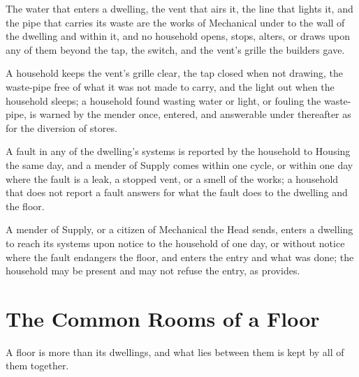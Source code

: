 \begin{clauses}
\item The water that enters a dwelling, the vent that airs it, the line that lights it, and the pipe that carries its waste are the works of Mechanical under  to the wall of the dwelling and within it, and no household opens, stops, alters, or draws upon any of them beyond the tap, the switch, and the vent's grille the builders gave.
\item A household keeps the vent's grille clear, the tap closed when not drawing, the waste-pipe free of what it was not made to carry, and the light out when the household sleeps; a household found wasting water or light, or fouling the waste-pipe, is warned by the mender once, entered, and answerable under  thereafter as for the diversion of stores.
\item A fault in any of the dwelling's systems is reported by the household to Housing the same day, and a mender of Supply comes within one cycle, or within one day where the fault is a leak, a stopped vent, or a smell of the works; a household that does not report a fault answers for what the fault does to the dwelling and the floor.
\item A mender of Supply, or a citizen of Mechanical the Head sends, enters a dwelling to reach its systems upon notice to the household of one day, or without notice where the fault endangers the floor, and enters the entry and what was done; the household may be present and may not refuse the entry, as  provides.
\end{clauses}

\section{The Common Rooms of a Floor}
\label{sec:housing:common-rooms-of-a-floor}

A floor is more than its dwellings, and what lies between them is kept by all of them together.

